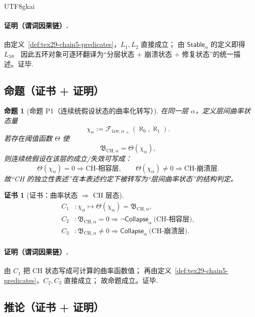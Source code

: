 \documentclass[12pt]{article}
\newtheorem{proposition}{命题}[section]
\newtheorem{Certificate}{证书}[section]
\newcommand{\KouJing}{\texorpdfstring{表述约定}{表述约定}}
\begin{document}
\begin{CJK*}{UTF8}{gkai}
\paragraph{证明（谓词因果链）.}
由定义~\ref{def:tex29-chain5-predicates}，$L_1,L_2$ 直接成立；
由 $\mathsf{Stable}_{\alpha}$ 的定义即得 $L_3$。
因此五环对象可逐环翻译为“分层状态 + 崩溃状态 + 修复状态”的统一描述。证毕.

\subsection{命题（证书 + 证明）}
\label{subsec:tex29-chain-discrete-kqemb-tower-4d-proposition}

\begin{proposition}[命题 P1（连续统假设状态的曲率化转写）]
\label{prop:tex29-chain5-ch-curvature}
在同一层 $\alpha$，定义层间曲率状态量
\[
  \chi_{\alpha}:=\mathcal{F}_{\mathrm{law},\alpha}\!\llcorner\!(\aleph_0,\aleph_1).
\]
若存在阈值函数 $\Theta$ 使
\[
  \mathfrak{B}_{\mathrm{CH},\alpha}=\Theta(\chi_{\alpha}),
\]
则连续统假设在该层的成立/失效可写成：
\[
  \Theta(\chi_{\alpha})=0\Rightarrow \text{CH-相容层},
  \qquad
  \Theta(\chi_{\alpha})\neq 0\Rightarrow \text{CH-崩溃层}.
\]
故“CH 的独立性表述”在本\KouJing 下被转写为“层间曲率状态”的结构判定。
\end{proposition}

\begin{Certificate}[证书：曲率状态 $\Rightarrow$ CH 层态]
\label{cert:tex29-chain5-ch-curvature}
\[
\begin{aligned}
  C_1 &: \chi_{\alpha}\mapsto \Theta(\chi_{\alpha})=\mathfrak{B}_{\mathrm{CH},\alpha},\\
  C_2 &: \mathfrak{B}_{\mathrm{CH},\alpha}=0\Rightarrow \neg\mathsf{Collapse}_{\alpha}\ \text{(CH-相容层)},\\
  C_3 &: \mathfrak{B}_{\mathrm{CH},\alpha}\neq 0\Rightarrow \mathsf{Collapse}_{\alpha}\ \text{(CH-崩溃层)}.
\end{aligned}
\]
\end{Certificate}

\paragraph{证明（谓词因果链）.}
由 $C_1$ 把 CH 状态写成可计算的曲率函数值；
再由定义~\ref{def:tex29-chain5-predicates}，$C_2,C_3$ 直接成立；
故命题成立。证毕.

\subsection{推论（证书 + 证明）}
\label{subsec:tex29-chain-discrete-kqemb-tower-4d-corollary}


\end{CJK*}
\end{document}
